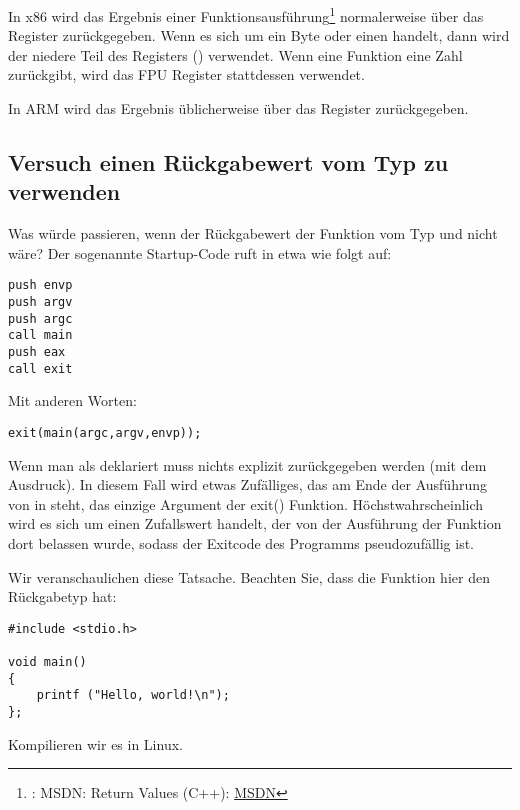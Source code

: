 
In x86 wird das Ergebnis einer Funktionsausführung\footnote{\Seealso: MSDN: Return Values (C++):
\href{http://go.yurichev.com/17258}{MSDN}} normalerweise über das \EAX Register zurückgegeben.
Wenn es sich um ein Byte oder einen \Tchar handelt, dann wird der niedere Teil des Registers \EAX (\AL) verwendet.
Wenn eine Funktion eine \Tfloat Zahl zurückgibt, wird das FPU Register  stattdessen verwendet.

In ARM wird das Ergebnis üblicherweise über das  Register zurückgegeben.

\subsection{Versuch einen Rückgabewert vom Typ \Tvoid zu verwenden}
\label{UseResultOfVoidFunc}

Was würde passieren, wenn der Rückgabewert der Funktion \main vom Typ \Tvoid und nicht \Tint wäre?
Der sogenannte Startup-Code ruft \main in etwa wie folgt auf:

\begin{lstlisting}[style=customasmx86]
push envp
push argv
push argc
call main
push eax
call exit
\end{lstlisting}

Mit anderen Worten:

\begin{lstlisting}[style=customc]
exit(main(argc,argv,envp));
\end{lstlisting}
Wenn man \main als \Tvoid deklariert muss nichts explizit zurückgegeben werden (mit dem  Ausdruck). In diesem
Fall wird etwas Zufälliges, das am Ende der Ausführung von \main in \EAX steht, das einzige Argument der exit()
Funktion.
Höchstwahrscheinlich wird es sich um einen Zufallswert handelt, der von der Ausführung der Funktion dort belassen wurde,
sodass der Exitcode des Programms pseudozufällig ist.
\par
Wir veranschaulichen diese Tatsache. 
Beachten Sie, dass die Funktion \main hier den Rückgabetyp \Tvoid hat: 

\begin{lstlisting}[style=customc]
#include <stdio.h>

void main()
{
	printf ("Hello, world!\n");
};
\end{lstlisting}

Kompilieren wir es in Linux.


